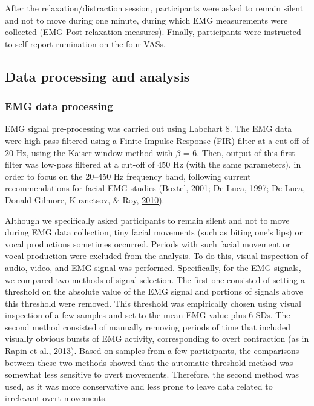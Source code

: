 \documentclass[a4paper,12pt,twoside,onecolumn,openright,final,oldfontcommands]{memoir}
\begin{document}
After the relaxation/distraction session, participants were asked to remain silent and not to move during one minute, during which EMG measurements were collected (EMG Post-relaxation measures). Finally, participants were instructed to self-report rumination on the four VASs.

\hypertarget{data-processing-and-analysis}{%
\subsection{Data processing and analysis}\label{data-processing-and-analysis}}

\hypertarget{emg-data-processing}{%
\subsubsection{EMG data processing}\label{emg-data-processing}}

EMG signal pre-processing was carried out using Labchart 8. The EMG data were high-pass filtered using a Finite Impulse Response (FIR) filter at a cut-off of 20 Hz, using the Kaiser window method with \(\beta\) = 6. Then, output of this first filter was low-pass filtered at a cut-off of 450 Hz (with the same parameters), in order to focus on the 20--450 Hz frequency band, following current recommendations for facial EMG studies (Boxtel, \protect\hyperlink{ref-boxtel_optimal_2001}{2001}; De Luca, \protect\hyperlink{ref-de_luca_use_1997}{1997}; De Luca, Donald Gilmore, Kuznetsov, \& Roy, \protect\hyperlink{ref-de_luca_filtering_2010}{2010}).

Although we specifically asked participants to remain silent and not to move during EMG data collection, tiny facial movements (such as biting one's lips) or vocal productions sometimes occurred. Periods with such facial movement or vocal production were excluded from the analysis. To do this, visual inspection of audio, video, and EMG signal was performed. Specifically, for the EMG signals, we compared two methods of signal selection. The first one consisted of setting a threshold on the absolute value of the EMG signal and portions of signals above this threshold were removed. This threshold was empirically chosen using visual inspection of a few samples and set to the mean EMG value plus 6 SDs. The second method consisted of manually removing periods of time that included visually obvious bursts of EMG activity, corresponding to overt contraction (as in Rapin et al., \protect\hyperlink{ref-Rapin2013}{2013}). Based on samples from a few participants, the comparisons between these two methods showed that the automatic threshold method was somewhat less sensitive to overt movements. Therefore, the second method was used, as it was more conservative and less prone to leave data related to irrelevant overt movements.
\end{document}
